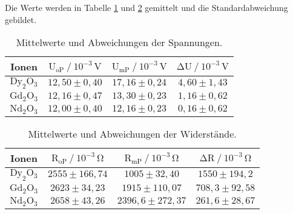 \begin{flushleft}
    Die Werte werden in Tabelle \ref{Tabelle4} und \ref{Tabelle5} gemittelt und die Standardabweichung gebildet.
\end{flushleft}


\begin{table}[H]
    \centering
    \caption{Mittelwerte und Abweichungen der Spannungen.} 
    \label{Tabelle4}
    \begin{tabular} {c || c  c  c }
        \toprule
        {Ionen} &
        {$ \text{U}_{\text{oP}} \mathbin{/} 10^{-3}\,\unit{\volt} $} &
        {$ \text{U}_{\text{mP}} \mathbin{/} 10^{-3}\,\unit{\volt} $} &
        {$ \increment\text{U} \mathbin{/} 10^{-3}\,\unit{\volt} $} \\
        \midrule
        $\text{Dy}_{2}\text{O}_{3}$ & $12,50 \pm 0,40$ & $17,16 \pm 0,24$ & $4,60 \pm 1,43$ \\
        $\text{Gd}_{2}\text{O}_{3}$ & $12,16 \pm 0,47$ & $13,30 \pm 0,23$ & $1,16 \pm 0,62$ \\
        $\text{Nd}_{2}\text{O}_{3}$ & $12,00 \pm 0,40$ & $12,16 \pm 0,23$ & $0,16 \pm 0,62$ \\
        \bottomrule
    \end{tabular} 
\end{table}

\begin{table}[H]
    \centering
    \caption{Mittelwerte und Abweichungen der Widerstände.} 
    \label{Tabelle5}
    \begin{tabular} {c || c  c  c }
        \toprule
        {Ionen} &
        {$ \text{R}_{\text{oP}} \mathbin{/} 10^{-3}\,\unit{\ohm} $} &
        {$ \text{R}_{\text{mP}} \mathbin{/} 10^{-3}\,\unit{\ohm} $} &
        {$ \increment \text{R}  \mathbin{/} 10^{-3}\,\unit{\ohm} $}  \\
        \midrule
        $\text{Dy}_{2}\text{O}_{3}$ & $2555 \pm 166,74$ & $1005   \pm 32,40$  & $1550  \pm 194,2$ \\
        $\text{Gd}_{2}\text{O}_{3}$ & $2623 \pm 34,23$  & $1915   \pm 110,07$ & $708,3 \pm 92,58$ \\
        $\text{Nd}_{2}\text{O}_{3}$ & $2658 \pm 43,26$  & $2396,6 \pm 272,37$ & $261,6 \pm 28,67$ \\ 
        \bottomrule
    \end{tabular} 
\end{table}

